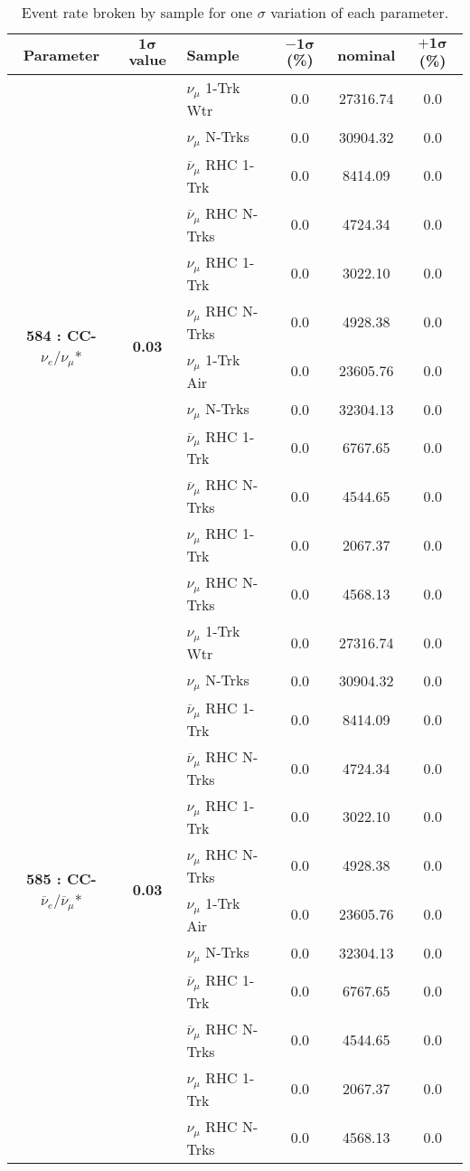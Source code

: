  \begin{table}[ht!]
 \centering
 \begin{tabular}{ c  c  l  c  c  c }
 \midrule[1.3pt]
 \textbf{Parameter} & \textbf{$\mathbf{1\sigma}$ value} & \textbf{Sample} & \textbf{$\mathbf{-1\sigma}$ (\%)}  &  \textbf{nominal}  &  \textbf{$\mathbf{+1\sigma}$ (\%)} \\
 \midrule[1.3pt]
 \multirow{12}{*}{\textbf{584 : CC-}$\nu_e/\nu_\mu$*} & \multirow{12}{*}{\textbf{0.03}} & $\nu_\mu$ 1-Trk Wtr &   0.0 &  27316.74 &   0.0 \\ 
  &  & $\nu_\mu$ N-Trks &   0.0 &  30904.32 &   0.0 \\ 
  &  & $\overline{\nu}_\mu$ RHC 1-Trk &   0.0 &  8414.09 &   0.0 \\ 
  &  & $\overline{\nu}_\mu$ RHC N-Trks &   0.0 &  4724.34 &   0.0 \\ 
  &  & $\nu_\mu$ RHC 1-Trk &   0.0 &  3022.10 &   0.0 \\ 
  &  & $\nu_\mu$ RHC N-Trks &   0.0 &  4928.38 &   0.0 \\ 
  &  & $\nu_\mu$ 1-Trk Air &   0.0 &  23605.76 &   0.0 \\ 
  &  & $\nu_\mu$ N-Trks &   0.0 &  32304.13 &   0.0 \\ 
  &  & $\overline{\nu}_\mu$ RHC 1-Trk &   0.0 &  6767.65 &   0.0 \\ 
  &  & $\overline{\nu}_\mu$ RHC N-Trks &   0.0 &  4544.65 &   0.0 \\ 
  &  & $\nu_\mu$ RHC 1-Trk &   0.0 &  2067.37 &   0.0 \\ 
  &  & $\nu_\mu$ RHC N-Trks &   0.0 &  4568.13 &   0.0 \\ 
 \midrule[1.3pt]
 \multirow{12}{*}{\textbf{585 : CC-}$\overline{\nu}_e/\overline{\nu}_\mu$*} & \multirow{12}{*}{\textbf{0.03}} & $\nu_\mu$ 1-Trk Wtr &   0.0 &  27316.74 &   0.0 \\ 
  &  & $\nu_\mu$ N-Trks &   0.0 &  30904.32 &   0.0 \\ 
  &  & $\overline{\nu}_\mu$ RHC 1-Trk &   0.0 &  8414.09 &   0.0 \\ 
  &  & $\overline{\nu}_\mu$ RHC N-Trks &   0.0 &  4724.34 &   0.0 \\ 
  &  & $\nu_\mu$ RHC 1-Trk &   0.0 &  3022.10 &   0.0 \\ 
  &  & $\nu_\mu$ RHC N-Trks &   0.0 &  4928.38 &   0.0 \\ 
  &  & $\nu_\mu$ 1-Trk Air &   0.0 &  23605.76 &   0.0 \\ 
  &  & $\nu_\mu$ N-Trks &   0.0 &  32304.13 &   0.0 \\ 
  &  & $\overline{\nu}_\mu$ RHC 1-Trk &   0.0 &  6767.65 &   0.0 \\ 
  &  & $\overline{\nu}_\mu$ RHC N-Trks &   0.0 &  4544.65 &   0.0 \\ 
  &  & $\nu_\mu$ RHC 1-Trk &   0.0 &  2067.37 &   0.0 \\ 
  &  & $\nu_\mu$ RHC N-Trks &   0.0 &  4568.13 &   0.0 \\ 
 \midrule[1.3pt]
 \end{tabular}
 \centering
 \caption{Event rate broken by sample for one $\sigma$ variation of each parameter.}
 \end{table}
 \addtocounter{table}{-1}

